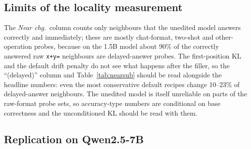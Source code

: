 \subsection{Limits of the locality measurement}
The \emph{Near chg.}\ column counts only neighbours that the unedited model answers correctly and immediately; these are mostly chat-format, two-shot and other-operation probes, because on the 1.5B model about 90\% of the correctly answered raw \texttt{x+y=} neighbours are delayed-answer probes. The first-position KL and the default drift penalty do not see what happens after the filler, so the ``(delayed)'' column and Table~\ref{tab:nearsub} should be read alongside the headline numbers: even the most conservative default recipes change 10--23\% of delayed-answer neighbours. The unedited model is itself unreliable on parts of the raw-format probe sets, so accuracy-type numbers are conditional on base correctness and the unconditioned KL should be read with them.

\subsection{Replication on Qwen2.5-7B}
\label{sec:7b}

